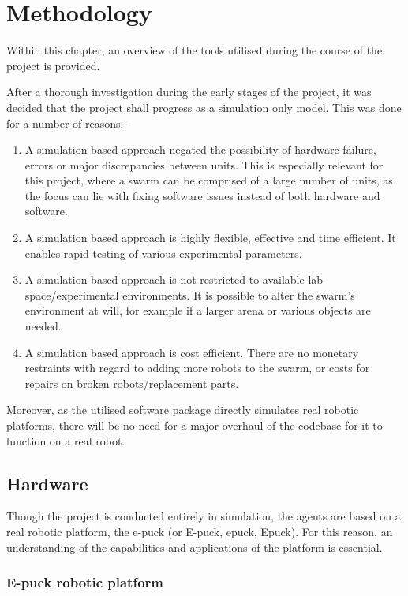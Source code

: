 \chapter{Methodology}
\label{chap:Methodology}

Within this chapter, an overview of the tools utilised during the course of the project is provided. 

After a thorough investigation during the early stages of the project, it was decided that the project shall progress as a simulation only model. This was done for a number of reasons:-

\begin{enumerate}
	\item  A simulation based approach negated the possibility of hardware failure, errors or major discrepancies between units. This is especially relevant for this project, where a swarm can be comprised of a large number of units, as the focus can lie with fixing software issues instead of both hardware and software.
	\item A simulation based approach is highly flexible, effective and time efficient. It enables rapid testing of various experimental parameters. 
	\item A simulation based approach is not restricted to available lab space/experimental environments. It is possible to alter the swarm's environment at will, for example if a larger arena or various objects are needed.
	\item A simulation based approach is cost efficient. There are no monetary restraints with regard to adding more robots to the swarm, or costs for repairs on broken robots/replacement parts.
\end{enumerate}
Moreover, as the utilised software package directly simulates real robotic platforms, there will be no need for a major overhaul of the codebase for it to function on a real robot.

\section{Hardware}
\label{section: hardware}

Though the project is conducted entirely in simulation, the agents are based on a real robotic platform, the e-puck (or E-puck, epuck, Epuck). For this reason, an understanding of the capabilities and applications of the platform is essential.

\subsection{E-puck robotic platform}
\label{subsection:hardware-desc}

